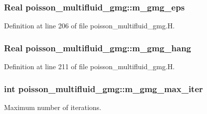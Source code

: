 \subsubsection[{\texorpdfstring{m\+\_\+gmg\+\_\+eps}{m_gmg_eps}}]{\setlength{\rightskip}{0pt plus 5cm}Real poisson\+\_\+multifluid\+\_\+gmg\+::m\+\_\+gmg\+\_\+eps\hspace{0.3cm}{\ttfamily [protected]}}\hypertarget{classpoisson__multifluid__gmg_af494cdcc81f7f3d61ed506004aa0b1c8}{}\label{classpoisson__multifluid__gmg_af494cdcc81f7f3d61ed506004aa0b1c8}


Definition at line 206 of file poisson\+\_\+multifluid\+\_\+gmg.\+H.

\subsubsection[{\texorpdfstring{m\+\_\+gmg\+\_\+hang}{m_gmg_hang}}]{\setlength{\rightskip}{0pt plus 5cm}Real poisson\+\_\+multifluid\+\_\+gmg\+::m\+\_\+gmg\+\_\+hang\hspace{0.3cm}{\ttfamily [protected]}}\hypertarget{classpoisson__multifluid__gmg_a1edc2bc1f3fab01b3913e16c05dfda6f}{}\label{classpoisson__multifluid__gmg_a1edc2bc1f3fab01b3913e16c05dfda6f}


Definition at line 211 of file poisson\+\_\+multifluid\+\_\+gmg.\+H.

\subsubsection[{\texorpdfstring{m\+\_\+gmg\+\_\+max\+\_\+iter}{m_gmg_max_iter}}]{\setlength{\rightskip}{0pt plus 5cm}int poisson\+\_\+multifluid\+\_\+gmg\+::m\+\_\+gmg\+\_\+max\+\_\+iter\hspace{0.3cm}{\ttfamily [protected]}}\hypertarget{classpoisson__multifluid__gmg_a6c5032bbfc64b6244999d8da8e221cbc}{}\label{classpoisson__multifluid__gmg_a6c5032bbfc64b6244999d8da8e221cbc}


Maximum number of iterations. 



